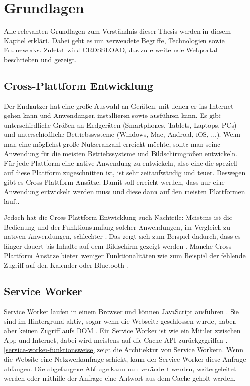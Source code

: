 \chapter{Grundlagen}
\label{Kap2}
Alle relevanten Grundlagen zum Verständnis dieser Thesis werden in diesem Kapitel erklärt. Dabei geht es um verwendete Begriffe, Technologien sowie Frameworks. Zuletzt wird CROSSLOAD, das zu erweiternde Webportal beschrieben und gezeigt.

\section{Cross-Plattform Entwicklung}
Der Endnutzer hat eine große Auswahl an Geräten, mit denen er ins Internet gehen kann und Anwendungen installieren sowie ausführen kann. Es gibt unterschiedliche Größen an Endgeräten (Smartphones, Tablets, Laptops, PCs) und unterschiedliche Betriebssysteme (Windows, Mac, Android, iOS, ...). Wenn man eine möglichst große Nutzeranzahl erreicht möchte, sollte man seine Anwendung für die meisten Betriebssysteme und Bildschirmgrößen entwickeln. Für jede Plattform eine native Anwendung zu entwickeln, also eine die speziell auf diese Plattform zugeschnitten ist, ist sehr zeitaufwändig und teuer. Deswegen gibt es Cross-Plattform Ansätze. Damit soll erreicht werden, dass nur eine Anwendung entwickelt werden muss und diese dann auf den meisten Plattformen läuft. 

Jedoch hat die Cross-Plattform Entwicklung auch Nachteile: Meistens ist die Bedienung und der Funktionsumfang solcher Anwendungen, im Vergleich zu nativen Anwendungen, schlechter \autocite{cross-plattform}. Das zeigt sich zum Beispiel dadurch, dass es länger dauert bis Inhalte auf dem Bildschirm gezeigt werden \autocite{cross-plattform-energy}. Manche Cross-Plattform Ansätze bieten weniger Funktionalitäten wie zum Beispiel der fehlende Zugriff auf den Kalender oder Bluetooth \autocite{cross-plattform-energy}.

\section{Service Worker}
Service Worker laufen in einem Browser und können JavaScript ausführen \autocite{Sheppard2017}. Sie sind im Hintergrund aktiv, sogar wenn die Webseite geschlossen wurde, haben aber keinen Zugriff aufs \ac{DOM} \autocite{Sheppard2017}. Ein Service Worker ist wie ein Mittler zwischen App und Internet, dabei wird meistens auf die Cache \ac{API} zurückgegriffen \autocite{Sheppard2017}. \autoref{service-worker-funktionsweise} zeigt die Architektur von Service Workern. Wenn die Website eine Netzwerkanfrage schickt, kann der Service Worker diese Anfrage abfangen. Die abgefangene Abfrage kann nun verändert werden, weitergeleitet werden oder mithilfe der Anfrage eine Antwort aus dem Cache geholt werden.

